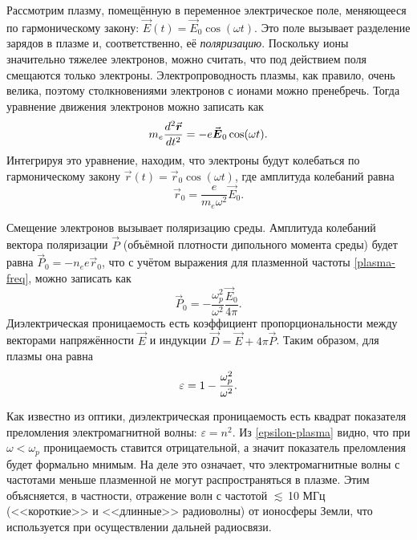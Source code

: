 \label{sec:epsilon}
Рассмотрим плазму, помещённую в переменное электрическое поле, меняющееся
по гармоническому закону: $\vec{E}(t)=\vec{E}_0 \cos (\omega t)$. 
Это поле вызывает разделение зарядов в плазме и, соответственно, её \emph{поляризацию}.
Поскольку ионы значительно тяжелее электронов, можно считать, что
под действием поля смещаются только электроны. Электропроводность
плазмы, как правило, очень велика, поэтому столкновениями электронов
с ионами можно пренебречь. Тогда уравнение движения электронов можно записать как
\begin{equation}
\eqmark{free_E}
m_e \frac{d^2 \vec{r}}{dt^2} = - e \vec{E}_0 \cos(\omega t).
\end{equation}
Интегрируя это уравнение, находим, что электроны будут колебаться по 
гармоническому закону
$\vec{r}(t) = \vec{r}_0 \cos(\omega t)$, где амплитуда колебаний равна
\[
\vec{r}_0 = \frac{e}{m_e\omega^2} \vec{E}_0.
\]

Смещение электронов вызывает поляризацию среды. Амплитуда колебаний 
вектора поляризации $\vec{P}$ (объёмной плотности дипольного момента среды) будет равна
$\vec{P}_0 = -n_e e \vec{r}_0$, что 
с учётом выражения для плазменной частоты \eqref{plasma-freq},
можно записать как
\[
\vec{P}_0 = -\frac{\omega_p^2}{\omega^2} \frac{\vec{E}_0}{4\pi}.
\]
Диэлектрическая проницаемость есть коэффициент пропорциональности
между векторами напряжённости $\vec{E}$ и индукции $\vec{D}=\vec{E}+4\pi \vec{P}$.
Таким образом, для плазмы она равна
\begin{equation}
\eqmark{epsilon-plasma}
\varepsilon = 1 - \frac{\omega_p^2}{\omega^2}.
\end{equation}


\begin{lab:example}
Как известно из оптики, диэлектрическая проницаемость есть
квадрат показателя преломления электромагнитной волны: $\varepsilon=n^2$.
Из \eqref{epsilon-plasma} видно, что при $\omega<\omega_p$ проницаемость
ставится отрицательной, а значит показатель преломления будет формально мнимым.
 На деле это означает, что электромагнитные волны с частотами меньше плазменной
 не могут распространяться в плазме. Этим объясняется, в частности, 
 отражение волн с частотой $\lesssim$\,10 МГц (<<короткие>> и <<длинные>> радиоволны) 
 от ионосферы Земли, что используется при осуществлении дальней радиосвязи.
\end{lab:example}


\label{sec:zonds}

